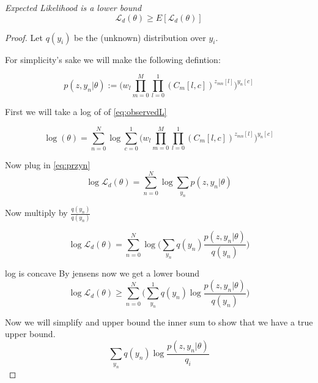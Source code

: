 \newpage
\begin{theorem}
\emph{Expected Likelihood is a lower bound}
\label{EMlower}
$$ \mathcal{L}_{d}(\theta) \geq E[\mathcal{L}_{d}(\theta)]$$
\begin{proof}

Let $q(y_{i})$ be the (unknown) distribution over $y_{i}$.

For simplicity's sake we will make the following defintion:

\begin{equation} \label{eq:przyn}
p(z,y_{n}|\theta) :=
\Big (w_{l} \displaystyle\prod\limits_{m=0}^{M} \displaystyle\prod\limits_{l=0}^{1} (C_{m}[l,c])^{z_{mn}[l]} \Big )^{y_{n}[c]}
\end{equation}


First we will take a log of of \eqref{eq:observedL}

\begin{equation}
\log (\theta) = \displaystyle\sum\limits_{n=0}^{N} \log
\displaystyle\sum\limits_{c=0}^{1}
\Big (w_{l} \displaystyle\prod\limits_{m=0}^{M} \displaystyle\prod\limits_{l=0}^{1} (C_{m}[l,c])^{z_{mn}[l]} \Big )^{y_{n}[c]}
\end{equation}

Now plug in \eqref{eq:przyn}
\begin{equation} \label{eq:lll}
\log \mathcal{L}_{d}(\theta) = \displaystyle\sum\limits_{n=0}^{N} \log \displaystyle\sum\limits_{y_{n}} p(z,y_{n} | \theta)
\end{equation}

Now multiply by $\frac{q(y_{n})}{q(y_{n})}$

\begin{equation}
\log \mathcal{L}_{d}(\theta) = \displaystyle\sum\limits_{n=0}^{N} \log \Big ( \displaystyle\sum\limits_{y_{n}} q(y_{n})\frac{p(z,y_{n} | \theta)}{q(y_{n})} \Big )
\end{equation}

log is concave By jensens now we get a lower bound
\begin{equation}\label{eq:jensens}
\log \mathcal{L}_{d}(\theta) \geq
\displaystyle\sum\limits_{n=0}^{N} \Big ( \displaystyle\sum\limits_{y_{n}}^{1} q(y_{n})\log \frac{p(z,y_{n} | \theta)}{q(y_{n})} \Big )
\end{equation}

Now we will simplify and upper bound the inner sum to show that we have a true upper bound.
\begin{equation}
\displaystyle\sum\limits_{y_{n}} q(y_{n}) \log \frac{p(z,y_{n}| \theta)}{q_{i}}
\end{equation}


\end{proof}
\end{theorem}

